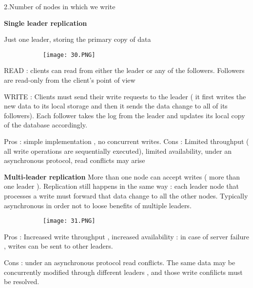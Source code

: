 \documentclass{article}
\begin{document}
\vspace{3mm}

2.Number of nodes in which we write

\vspace{2mm}
\textbf{Single leader replication}

Just one leader, storing the primary copy of data



\begin{figure}[ht!]
  \centering
  \begin{subfigure}[b]{0.35\linewidth}
    \texttt{[image: 30.PNG]}
  \end{subfigure}
\end{figure}


READ : clients can read from either the leader or any of the followers. Followers are read-only from the client's point of view

WRITE : Clients must send their write requests to the leader ( it first writes the new data to its local storage and then it sends the data change to all of its followers). Each follower takes the log from the leader and updates its local copy of the database accordingly.

Pros : simple implementation , no concurrent writes.
Cons : Limited throughput ( all write operations are sequentially executed), limited availability, under an asynchronous protocol, read conflicts may arise

\vspace{2mm}
\textbf{Multi-leader replication}
More than one node can accept writes ( more than one leader ). 
Replication still happens in the same way : each leader node that processes a write must forward that data change to all the other nodes. Typically asynchronous in order not to loose benefits of multiple leaders.


\begin{figure}[ht!]
  \centering
  \begin{subfigure}[b]{0.35\linewidth}
    \texttt{[image: 31.PNG]}
  \end{subfigure}
\end{figure}

Pros : Increased write throughput , increased availability : in case of server failure , writes can be sent to other leaders. 

Cons : under an asynchronous protocol read conflicts. The same data may be concurrently modified through different leaders , and those write confilicts must be resolved.
\end{document}
